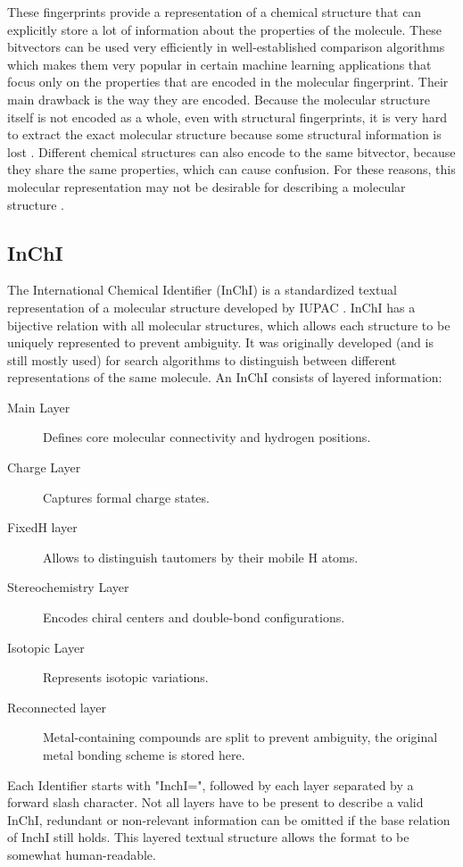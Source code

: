 These fingerprints provide a representation of a chemical structure that can explicitly store a lot of information about the properties of the molecule.
These bitvectors can be used very efficiently in well-established comparison algorithms which makes them very popular in certain machine learning applications that focus only on the properties that are encoded in the molecular fingerprint.
Their main drawback is the way they are encoded.
Because the molecular structure itself is not encoded as a whole, even with structural fingerprints, it is very hard to extract the exact molecular structure because some structural information is lost \cite{kretschmer2023small}.
Different chemical structures can also encode to the same bitvector, because they share the same properties, which can cause confusion.
For these reasons, this molecular representation may not be desirable for describing a molecular structure \cite{dablander2024sort}.

\subsection{InChI}

The International Chemical Identifier (InChI) is a standardized textual representation of a molecular structure developed by IUPAC \cite{heller2015inchi}. InChI has a bijective relation with all molecular structures, which allows each structure to be uniquely represented to prevent ambiguity. It was originally developed (and is still mostly used) for search algorithms to distinguish between different representations of the same molecule. An InChI consists of layered information:
\begin{description}
    \item[Main Layer]Defines core molecular connectivity and hydrogen positions.
    \item[Charge Layer]Captures formal charge states.
    \item[FixedH layer]Allows to distinguish tautomers by their mobile H atoms.
    \item[Stereochemistry Layer]Encodes chiral centers and double-bond configurations.
    \item[Isotopic Layer]Represents isotopic variations.
    \item[Reconnected layer]Metal-containing compounds are split to prevent ambiguity, the original metal bonding scheme is stored here.
\end{description}

Each Identifier starts with "InchI=", followed by each layer separated by a forward slash character.
Not all layers have to be present to describe a valid InChI,
redundant or non-relevant information can be omitted if the base relation of InchI still holds.
This layered textual structure allows the format to be somewhat human-readable.


